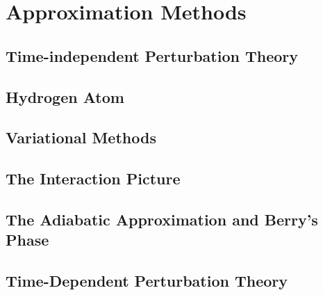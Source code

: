 \section{Approximation Methods}
\subsection{Time-independent Perturbation Theory}
\subsection{Hydrogen Atom}
\subsection{Variational Methods}
\subsection{The Interaction Picture}
\subsection{The Adiabatic Approximation and Berry's Phase}
\subsection{Time-Dependent Perturbation Theory}
